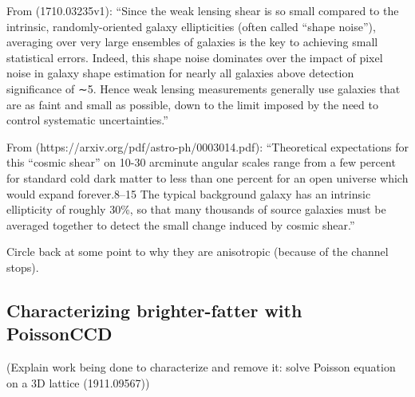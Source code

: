 From (1710.03235v1): ``Since the weak lensing shear is so small compared to the intrinsic, randomly-oriented galaxy ellipticities (often called “shape noise”), averaging over very large ensembles of galaxies is the key to achieving small statistical errors. Indeed, this shape noise dominates over the impact of pixel noise in galaxy shape estimation for nearly all galaxies above detection significance of ∼5. Hence weak lensing measurements generally use galaxies that are as faint and small as possible, down to the limit imposed by the need to control systematic uncertainties.''

From (https://arxiv.org/pdf/astro-ph/0003014.pdf): ``Theoretical expectations for this “cosmic shear” on 10-30 arcminute angular scales range from a few percent for standard cold dark matter to less than one percent for an open universe which would expand forever.8–15 The typical background galaxy has an intrinsic ellipticity of roughly 30\%, so that many thousands of source galaxies must be averaged together to detect the small change induced by cosmic shear.''

Circle back at some point to why they are anisotropic (because of the channel stops).

\subsection{Characterizing brighter-fatter with PoissonCCD}

(Explain work being done to characterize and remove it: solve Poisson equation on a 3D lattice (1911.09567))

